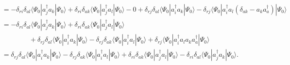 \documentclass[a4paper]{book}
\newcounter{solution}[chapter]
\begin{document}
\begin{solution}
\begin{align*}
		&= - \delta_{ri} \delta_{al} \langle \Psi_0 | a^\dagger_j a_k | \Psi_0 \rangle + \delta_{ri} \delta_{ak} \langle \Psi_0 | a^\dagger_j a_l | \Psi_0 \rangle - 0 + \delta_{rj} \delta_{al} \langle \Psi_0 | a^\dagger_i a_k | \Psi_0 \rangle - \delta_{rj} \langle \Psi_0 | a^\dagger_i a_l ( \delta_{ak} - a_k a^\dagger_a ) | \Psi_0 \rangle \\
		&= - \delta_{ri} \delta_{al} \langle \Psi_0 | a^\dagger_j a_k | \Psi_0 \rangle + \delta_{ri} \delta_{ak} \langle \Psi_0 | a^\dagger_j a_l | \Psi_0 \rangle \\
		&\hspace{4em} + \delta_{rj} \delta_{al} \langle \Psi_0 | a^\dagger_i a_k | \Psi_0 \rangle - \delta_{rj} \delta_{ak} \langle \Psi_0 | a^\dagger_i a_l | \Psi_0 \rangle + \delta_{rj} \langle \Psi_0 | a^\dagger_i a_l a_k a^\dagger_a | \Psi_0 \rangle  \\
		&= \delta_{rj} \delta_{al} \langle \Psi_0 | a^\dagger_i a_k | \Psi_0 \rangle - \delta_{rj} \delta_{ak} \langle \Psi_0 | a^\dagger_i a_l | \Psi_0 \rangle + \delta_{ri} \delta_{ak} \langle \Psi_0 | a^\dagger_j a_l | \Psi_0 \rangle - \delta_{ri} \delta_{al} \langle \Psi_0 | a^\dagger_j a_k | \Psi_0 \rangle .
	\end{align*}
	

\end{solution}
\end{document}
